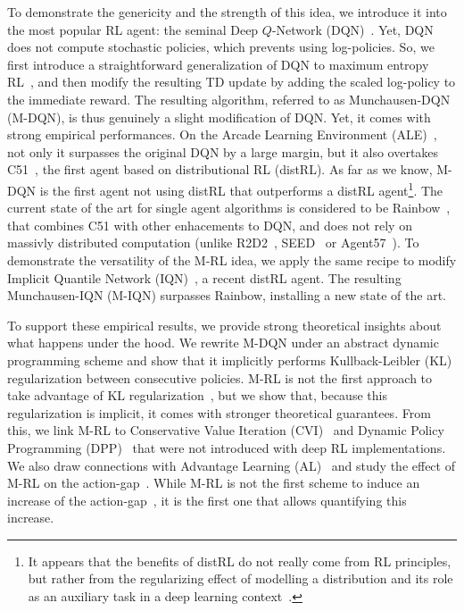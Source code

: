 \documentclass{article}
\begin{document}
To demonstrate the genericity and the strength of this idea, we introduce it into the most popular RL agent: the seminal Deep $Q$-Network (DQN)~\citep{mnih2015human}. Yet, DQN does not compute stochastic policies, which prevents using log-policies. So, we first introduce a straightforward generalization of DQN to maximum entropy RL~\cite{ziebart2010modeling,haarnoja2018soft}, and then modify the resulting TD update by adding the scaled log-policy to the immediate reward. The resulting algorithm, referred to as Munchausen-DQN (M-DQN), is thus genuinely a slight modification of DQN. Yet, it comes with  strong empirical performances. On the Arcade Learning Environment (ALE)~\cite{bellemare2013arcade}, not only it surpasses the original DQN by a large margin, but it also overtakes C51~\cite{bellemare2017distributional}, the first agent based on distributional RL (distRL). As far as we know, M-DQN is the first agent not using distRL that outperforms a distRL agent\footnote{It appears that the benefits of distRL do not really come from RL principles, but rather from the regularizing effect of modelling a distribution and its role as an auxiliary task in a deep learning
context~\cite{lyle2019comparative}.}. The current state of the art for single agent algorithms is considered to be Rainbow~\citep{hessel2018rainbow}, that combines C51 with other enhacements to DQN, and does not rely on massivly distributed computation (unlike R2D2~\cite{kapturowski2018recurrent}, SEED~\cite{Espeholt2020SEED} or Agent57~\cite{badia2020agent57}). To demonstrate the versatility of the M-RL idea, we apply the same recipe to modify Implicit Quantile Network (IQN)~\cite{dabney2018implicit}, a recent distRL agent. The resulting Munchausen-IQN (M-IQN) surpasses Rainbow, installing a new state of the art. 


To support these empirical results, we provide strong theoretical insights about what happens under the hood. We rewrite M-DQN under an abstract dynamic programming scheme and show that it implicitly performs Kullback-Leibler (KL) regularization between consecutive policies. M-RL is not the first approach to take advantage of KL regularization~\cite{schulman2015trust,abdolmaleki2018maximum}, but we show that, because this regularization is implicit, it comes with stronger theoretical guarantees. From this, we link M-RL to Conservative Value Iteration (CVI)~\cite{kozuno2019theoretical} and Dynamic Policy Programming (DPP)~\cite{azar2012dynamic} that were not introduced with deep RL implementations.
 We also draw connections with Advantage Learning (AL)~\cite{baird1999reinforcement,bellemare2016increasing} and study the effect of M-RL on the action-gap~\cite{farahmand2011action}. While M-RL is not the first scheme to induce an increase of the action-gap~\cite{bellemare2016increasing}, it is the first one that allows quantifying this increase.
\end{document}
